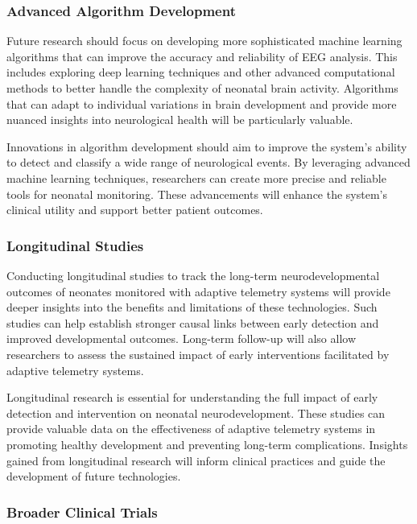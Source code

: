 \documentclass[12pt,journal,compsoc]{IEEEtran}
\begin{document}
\subsubsection{Advanced Algorithm Development}

Future research should focus on developing more sophisticated machine learning algorithms that can improve the accuracy and reliability of EEG analysis. This includes exploring deep learning techniques and other advanced computational methods to better handle the complexity of neonatal brain activity. Algorithms that can adapt to individual variations in brain development and provide more nuanced insights into neurological health will be particularly valuable.

Innovations in algorithm development should aim to improve the system's ability to detect and classify a wide range of neurological events. By leveraging advanced machine learning techniques, researchers can create more precise and reliable tools for neonatal monitoring. These advancements will enhance the system's clinical utility and support better patient outcomes.

\subsubsection{Longitudinal Studies}

Conducting longitudinal studies to track the long-term neurodevelopmental outcomes of neonates monitored with adaptive telemetry systems will provide deeper insights into the benefits and limitations of these technologies. Such studies can help establish stronger causal links between early detection and improved developmental outcomes. Long-term follow-up will also allow researchers to assess the sustained impact of early interventions facilitated by adaptive telemetry systems.

Longitudinal research is essential for understanding the full impact of early detection and intervention on neonatal neurodevelopment. These studies can provide valuable data on the effectiveness of adaptive telemetry systems in promoting healthy development and preventing long-term complications. Insights gained from longitudinal research will inform clinical practices and guide the development of future technologies.

\subsubsection{Broader Clinical Trials}
\end{document}
